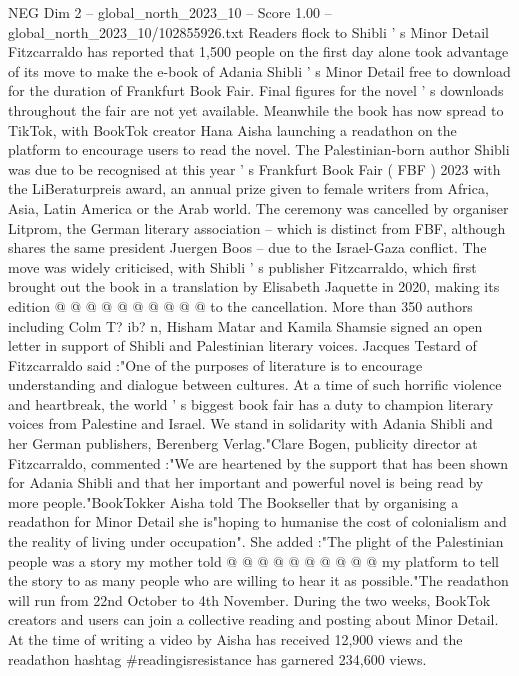 \begin{textsample}{NEG Dim 2 – global\_north\_2023\_10 – Score 1.00 – global\_north\_2023\_10/102855926.txt}  \label{ex:f2_neg_299}
Readers flock to Shibli ' s Minor Detail Fitzcarraldo has reported that 1,500 people on the first day alone took advantage of its move to make the e-book of Adania Shibli ' s Minor Detail free to download for the duration of Frankfurt Book Fair.
Final figures for the novel ' s downloads throughout the fair are not yet available.
Meanwhile the book has now spread to TikTok, with BookTok creator Hana Aisha launching a readathon on the platform to encourage users to read the novel.
The Palestinian-born author Shibli was due to be recognised at this year ' s Frankfurt Book Fair ( FBF ) 2023 with the LiBeraturpreis award, an annual prize given to female writers from Africa, Asia, Latin America or the Arab world.
The ceremony was cancelled by organiser Litprom, the German literary association -- which is distinct from FBF, although shares the same president Juergen Boos -- due to the Israel-Gaza conflict.
The move was widely criticised, with Shibli ' s publisher Fitzcarraldo, which first brought out the book in a translation by Elisabeth Jaquette in 2020, making its edition @ @ @ @ @ @ @ @ @ @ to the cancellation.
More than 350 authors including Colm T? ib? n, Hisham Matar and Kamila Shamsie signed an open letter in support of Shibli and Palestinian literary voices.
Jacques Testard of Fitzcarraldo said :"One of the purposes of literature is to encourage understanding and dialogue between cultures.
At a time of such horrific violence and heartbreak, the world ' s biggest book fair has a duty to champion literary voices from Palestine and Israel.
We stand in solidarity with Adania Shibli and her German publishers, Berenberg Verlag."Clare Bogen, publicity director at Fitzcarraldo, commented :"We are heartened by the support that has been shown for Adania Shibli and that her important and powerful novel is being read by more people."BookTokker Aisha told The Bookseller that by organising a readathon for Minor Detail she is"hoping to humanise the cost of colonialism and the reality of living under occupation".
She added :"The plight of the Palestinian people was a story my mother told @ @ @ @ @ @ @ @ @ @ my platform to tell the story to as many people who are willing to hear it as possible."The readathon will run from 22nd October to 4th November.
During the two weeks, BookTok creators and users can join a collective reading and posting about Minor Detail.
At the time of writing a video by Aisha has received 12,900 views and the readathon hashtag \#readingisresistance has garnered 234,600 views.

\end{textsample}
